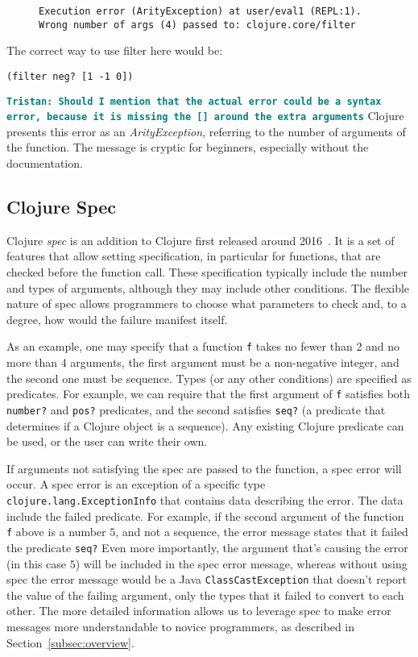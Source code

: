 \documentclass[12pt]{article}
\newcommand{\comment}[1]{{\bf \tt  {#1}}}
\newcommand{\emcomment}[1]{\textcolor{ForestGreen}{\comment{Elena: {#1}}}}
\newcommand{\tkcomment}[1]{\textcolor{Teal}{\comment{Tristan: {#1}}}}
\begin{document}
 \begin{figure}[h]
	\centering
	\begin{lstlisting}[breaklines=true, basicstyle=\ttfamily]
Execution error (ArityException) at user/eval1 (REPL:1).
Wrong number of args (4) passed to: clojure.core/filter
	\end{lstlisting}
\end{figure}
The correct way to use filter here would be:
\begin{verbatim}
(filter neg? [1 -1 0])
\end{verbatim}
\tkcomment{Should I mention that the actual error could be a syntax error, because it is missing the [] around the extra arguments}
 Clojure presents this error as an {\it ArityException}, referring to the number of arguments of the function. 
 The message is cryptic for beginners, especially without the documentation.

\subsection{Clojure Spec}\label{subsec:spec}
Clojure \textit{spec} is an addition to Clojure first released around 2016~\cite{spec-overview}.
It is a set of features that allow setting specification, in particular for functions, that are checked before the function call. 
These specification typically include the number and types of arguments, although they may include other conditions.
The flexible nature of spec allows programmers to choose what parameters to check and, to a degree, how would the failure manifest itself. 

As an example, one may specify that a function \texttt{f} takes no fewer than 2 and no more than 4 arguments, the first argument must be a non-negative integer, and the second one must be sequence. 
Types (or any other conditions) are specified as predicates. 
For example, we can require that the first argument of \texttt{f} satisfies both \texttt{number?} and \texttt{pos?} predicates, and the second satisfies \texttt{seq?} (a predicate that determines if a Clojure object is a sequence).
Any existing Clojure predicate can be used, or the user can write their own. 

If arguments not satisfying the spec are passed to the function, a spec error will occur. 
A spec error is an exception of a specific type \texttt{clojure.lang.ExceptionInfo} that contains data describing the error. 
The data include the failed predicate.
For example, if the second argument of the function 
\texttt{f} above is a number $5$, and not a sequence, the error message states that it failed the predicate \texttt{seq?}
Even more importantly, the argument that's causing the error (in this case $5$) will be included in the spec error message, whereas without using spec the error message would be a Java \texttt{ClassCastException} that doesn't report the value of the failing argument, only the types that it failed to convert to each other. 
The more detailed information allows us to leverage spec to make error messages more understandable to novice programmers, as described in Section~\ref{subsec:overview}. 
\end{document}

